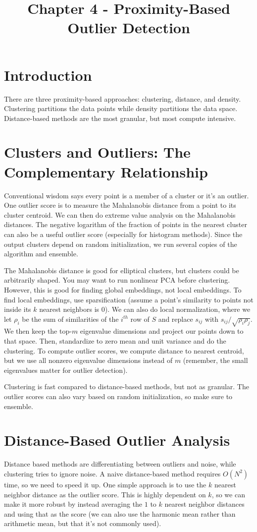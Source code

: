\documentclass[a4paper]{article}
\title{Chapter 4 - Proximity-Based Outlier Detection}
\date{}
\begin{document}
\maketitle

\section{Introduction}
There are three proximity-based approaches: clustering, distance,
and density. Clustering partitions the data points while density partitions the
data space. Distance-based methods are the most granular, but most compute
intensive.

\section{Clusters and Outliers: The Complementary Relationship}
Conventional wisdom says every point is a member of a cluster or it's an
outlier. One outlier score is to measure the Mahalanobis distance from a
point to its cluster centroid. We can then do extreme value analysis on the
Mahalanobis distances. The negative logarithm of the fraction of points in
the nearest cluster can also be a useful outlier score (especially for
histogram methods). Since the output clusters depend on random initialization,
we run several copies of the algorithm and ensemble.

The Mahalanobis distance is good for elliptical clusters, but clusters could
be arbitrarily shaped. You may want to run nonlinear PCA before clustering.
However, this is good for finding global embeddings, not local embeddings. To
find local embeddings, use sparsification (assume a point's similarity to
points not inside its $k$ nearest neighbors is 0). We can also do local
normalization, where we let $\rho_{i}$ be the sum of similarities of the
$i^{th}$ row of $S$ and replace $s_{ij}$ with $s_{ij}/\sqrt{\rho_i \rho_j}$.
We then keep the top-$m$ eigenvalue dimensions and project our points down
to that space. Then, standardize to zero mean and unit variance and do the
clustering. To compute outlier scores, we compute distance to nearest
centroid, but we use all nonzero eigenvalue dimensions instead of $m$ (remember,
the small eigenvalues matter for outlier detection).

Clustering is fast compared to distance-based methods, but not as granular. The
outlier scores can also vary based on random initialization, so make sure to
ensemble.

\section{Distance-Based Outlier Analysis}
Distance based methods are differentiating between outliers and noise,
while clustering tries to ignore noise. A naive distance-based method requires
$O(N^2)$ time, so we need to speed it up. One simple approach is to use the $k$
nearest neighbor distance as the outlier score. This is highly dependent on $k$,
so we can make it more robust by instead averaging the $1$ to $k$ nearest
neighbor distances and using that as the score (we can also use the harmonic
mean rather than arithmetic mean, but that it's not commonly used).
\end{document}
